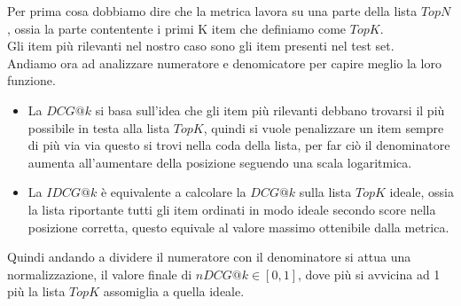 Per prima cosa dobbiamo dire che la metrica lavora su una parte della lista $TopN$, ossia la parte contentente i primi K item che definiamo come $TopK$.\\
Gli item più rilevanti nel nostro caso sono gli item presenti nel test set.\\
Andiamo ora ad analizzare numeratore e denomicatore per capire meglio la loro funzione.
\begin{itemize}
	\item La $DCG@k$ si basa sull'idea che gli item più rilevanti debbano trovarsi il più possibile in testa alla lista $TopK$, quindi si vuole penalizzare un item sempre di più via via questo si trovi nella coda della lista, per far ciò il denominatore aumenta all'aumentare della posizione seguendo una scala logaritmica. 
	\item La $IDCG@k$ è equivalente a calcolare la $DCG@k$ sulla lista $TopK$ ideale, ossia la lista riportante tutti gli item ordinati in modo ideale secondo score nella posizione corretta, questo equivale al valore massimo ottenibile dalla metrica. 
\end{itemize}

Quindi andando a dividere il numeratore con il denominatore si attua una normalizzazione, il valore finale di $nDCG@k \in [0,1]$, dove più si avvicina ad 1 più la lista $TopK$ assomiglia a quella ideale.